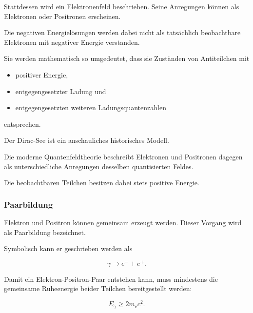 Stattdessen wird ein Elektronenfeld beschrieben. Seine Anregungen
können als Elektronen oder Positronen erscheinen.

Die negativen Energielösungen werden dabei nicht als tatsächlich
beobachtbare Elektronen mit negativer Energie verstanden.

Sie werden mathematisch so umgedeutet, dass sie Zuständen von
Antiteilchen mit

\begin{itemize}
	\item positiver Energie,
	\item entgegengesetzter Ladung und
	\item entgegengesetzten weiteren Ladungsquantenzahlen
\end{itemize}

entsprechen.

\begin{DidacticBox}
	\label{box:historisches_bild_moderne_theorie}
	
	Der Dirac-See ist ein anschauliches historisches Modell.
	
	Die moderne Quantenfeldtheorie beschreibt Elektronen und Positronen
	dagegen als unterschiedliche Anregungen desselben quantisierten
	Feldes.
	
	Die beobachtbaren Teilchen besitzen dabei stets positive Energie.
\end{DidacticBox}

\subsubsection*{Paarbildung}

Elektron und Positron können gemeinsam erzeugt werden. Dieser Vorgang
wird als Paarbildung%
 bezeichnet.

Symbolisch kann er geschrieben werden als

\begin{equation}
	\gamma
	\longrightarrow
	e^-
	+
	e^+.
	\label{eq:paarbildung_ein_photon_symbolisch}
\end{equation}

Damit ein Elektron-Positron-Paar entstehen kann, muss mindestens die
gemeinsame Ruheenergie beider Teilchen bereitgestellt werden:

\begin{equation}
	E_{\gamma}
	\geq
	2m_{\mathrm e}c^2.
\end{equation}

